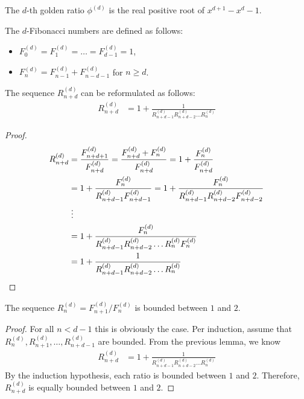 \documentclass[english,version-2020-11]{uzl-thesis}
\begin{document}
\begin{definition}
  The $d$-th golden ratio $\phi^{(d)}$ is the real positive root of $x^{d+1} - x^d - 1$.
\end{definition}

\begin{definition}
  The $d$-Fibonacci numbers are defined as follows:
  \begin{itemize}
    \item $F^{(d)}_0 = F^{(d)}_1 = \dots = F^{(d)}_{d-1} = 1$,
    \item $F^{(d)}_{n} = F^{(d)}_{n-1} + F^{(d)}_{n-d-1}$ for $n \ge d$.
  \end{itemize}
\end{definition}

\begin{lemma}
  The sequence $R^{(d)}_{n+d}$ can be reformulated as follows:
  \begin{align*}
    R^{(d)}_{n+d}
    & = 1 + \frac{1}{R^{(d)}_{n+d-1} R^{(d)}_{n+d-2} \dots R^{(d)}_n}
  \end{align*}
\end{lemma}

\begin{proof}
  \begin{align*}
    R^{(d)}_{n+d}
    & = \frac{F^{(d)}_{n+d+1}}{F^{(d)}_{n+d}}
    = \frac{F^{(d)}_{n+d} + F^{(d)}_{n}}{F^{(d)}_{n+d}}
    = 1 + \frac{F^{(d)}_{n}}{F^{(d)}_{n+d}} \\
    & = 1 + \frac{F^{(d)}_{n}}{R^{(d)}_{n+d-1} F^{(d)}_{n+d-1}}
    = 1 + \frac{F^{(d)}_{n}}{R^{(d)}_{n+d-1} R^{(d)}_{n+d-2} F^{(d)}_{n+d-2}} \\
    & \mathrel{\vdots} \\
    & = 1 + \frac{F^{(d)}_{n}}{R^{(d)}_{n+d-1} R^{(d)}_{n+d-2} \dots R^{(d)}_n F^{(d)}_n} \\
    & = 1 + \frac{1}{R^{(d)}_{n+d-1} R^{(d)}_{n+d-2} \dots R^{(d)}_n}
    \qedhere
  \end{align*}
\end{proof}

\begin{lemma}
  The sequence $R^{(d)}_n = F^{(d)}_{n+1} / F^{(d)}_{n}$ is bounded between $1$ and $2$.
\end{lemma}

\begin{proof}
  For all $n < d - 1$ this is obviously the case.
  Per induction, assume that $R^{(d)}_n, R^{(d)}_{n+1}, \dots, R^{(d)}_{n+d-1}$ are bounded.
  From the previous lemma, we know
  \begin{align*}
    R^{(d)}_{n+d}
    & = 1 + \frac{1}{R^{(d)}_{n+d-1} R^{(d)}_{n+d-2} \dots R^{(d)}_n}
  \end{align*}
  By the induction hypothesis, each ratio is bounded between $1$ and $2$.
  Therefore, $R^{(d)}_{n+d}$ is equally bounded between $1$ and $2$.
\end{proof}
\end{document}
